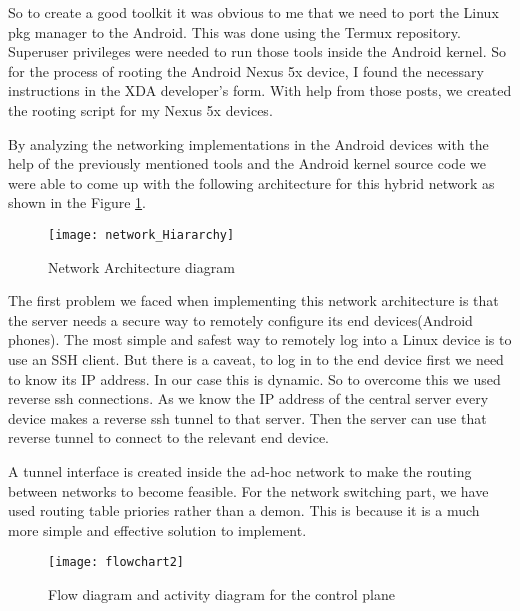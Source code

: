 \vspace{12pt}

So to create a good toolkit it was obvious to me that we need to port the Linux pkg manager to the Android.  This was done using the Termux repository. Superuser privileges were needed to run those tools inside the Android kernel. So for the process of rooting the Android Nexus 5x device, I found the necessary instructions in the XDA developer’s form. With help from those posts, we created the rooting script for my Nexus 5x devices.




\vspace{12pt}


By analyzing the networking implementations in the Android devices with the help of the previously mentioned tools and the Android kernel source code we were able to come up with the following architecture for this hybrid network as shown in the Figure \ref{fig:pca_coeff_z_swd}.
\clearpage
\vspace{12pt}
\begin{figure}[H]
    \centering
    \texttt{[image: network\_Hiararchy]}
    \caption{Network Architecture diagram }
    \label{fig:pca_coeff_z_swd}
\end{figure}


\vspace{12pt}
The first problem we faced when implementing this network architecture is that the server needs a secure way to remotely configure its end devices(Android phones). The most simple and safest way to remotely log into a Linux device is to use an SSH client. But there is a caveat, to log in to the end device first we need to know its IP address. In our case this is dynamic. So to overcome this we used reverse ssh connections. As we know the IP address of the central server every device makes a reverse ssh tunnel to that server. Then the server can use that reverse tunnel to connect to the relevant end device. 

\vspace{12pt}

A tunnel interface is created inside the ad-hoc network to make the routing between networks to become feasible. For the network switching part, we have used routing table priories rather than a demon. This is because it is a much more simple and effective solution to implement. 

\vspace{12pt}
\begin{figure}[H]
    \centering
    \texttt{[image: flowchart2]}
    \caption{Flow diagram and activity diagram for the control plane}
    \label{fig:pca_coeff_z_1121}
\end{figure}
\vspace{12pt}

